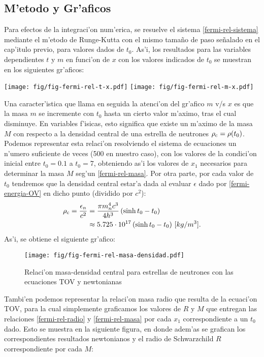 \subsection{M'etodo y Gr'aficos}
Para efectos de la integraci'on num'erica, se resuelve el sistema \eqref{fermi-rel-sistema} mediante el m'etodo de Runge-Kutta con el mismo tama\~no de paso se\~nalado en el cap'itulo previo, para valores dados de $t_0$. As'i, los resultados para las variables dependientes $t$ y $m$ en funci'on de $x$ con los valores indicados de $t_0$ se muestran en los siguientes gr'aficos:

\begin{multicols}{2}
\texttt{[image: fig/fig-fermi-rel-t-x.pdf]}
\texttt{[image: fig/fig-fermi-rel-m-x.pdf]}
\end{multicols}

Una caracter'istica que llama en seguida la atenci'on del gr'afico $m$ v/s $x$ es que la masa $m$ se incremente con $t_0$ hasta un cierto valor m'aximo, tras el cual disminuye. En variables f'isicas, esto significa que existe un m'aximo de la masa $M$ con respecto a la densidad central de una estrella de neutrones $\rho_{\rm c}=\rho(t_0)$. Podemos representar esta relaci'on resolviendo el sistema de ecuaciones un n'umero suficiente de veces (500 en nuestro caso), con los valores de la condici'on inicial entre $t_0=0.1$ a $t_0=7$, obteniendo as'i los valores de $x_1$ necesarios para determinar la masa $M$ seg'un \eqref{fermi-rel-masa}. Por otra parte, por cada valor de $t_0$ tendremos que la densidad central estar'a dada al evaluar $\epsilon$ dado por \eqref{fermi-energia-OV} en dicho punto (dividido por $c^2$):
\begin{align}
\rho_{\rm c}=\frac{\epsilon_{n}}{c^2}&=\frac{\pi m_{n}^4c^3}{4h^3}\left(\sinh t_0-t_0\right)\\
&\approx5.725\cdot10^{17}\left(\sinh t_0-t_0\right)\,[kg/m^3].
\end{align}
As'i, se obtiene el siguiente gr'afico:

\begin{figure}[H]
\centering
\texttt{[image: fig/fig-fermi-rel-masa-densidad.pdf]}
\caption{Relaci'on masa-densidad central para estrellas de neutrones con las ecuaciones TOV y newtonianas}\label{grafico-fermi-rel-masa-densidad}
\end{figure}
Tambi'en podemos representar la relaci'on masa radio que resulta de la ecuaci'on TOV, para la cual simplemente graficamos los valores de $R$ y $M$ que entregan las relaciones \eqref{fermi-rel-radio} y \eqref{fermi-rel-masa} por cada $x_1$ correspondiente a un $t_0$ dado. Esto se muestra en la siguiente figura, en donde adem'as se grafican los correspondientes resultados newtonianos y el radio de Schwarzchild $R$ correspondiente por cada $M$:

